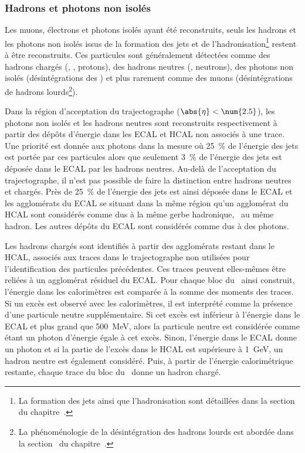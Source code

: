 \subsubsection{Hadrons et photons non isolés}
Les muons, électrons et photons isolés ayant été reconstruits, seuls les hadrons et les photons non isolés issus de la formation des jets et de l'hadronisation\footnote{La formation des jets ainsi que l'hadronisation sont détaillées dans la section~ du chapitre~.} restent à être reconstruits.
Ces particules sont généralement détectées comme des hadrons chargés (\pionpm, \Kaonpm, protons), des hadrons neutres (\Kaonlong, neutrons), des photons non isolés (désintégrations des \pionnull) et plus rarement comme des muons (désintégrations de hadrons lourds\footnote{La phénoménologie de la désintégration des hadrons lourds est abordée dans la section~ du chapitre~.}).
\par Dans la région d'acceptation du trajectographe ($\abs{\eta}<\num{2.5}$), les photons non isolés et les hadrons neutres sont reconstruits respectivement à partir des dépôts d'énergie dans les ECAL et HCAL non associés à une trace.
Une priorité est donnée aux photons dans la mesure où \SI{25}{\%} de l'énergie des jets est portée par ces particules alors que seulement \SI{3}{\%} de l'énergie des jets est déposée dans le ECAL par les hadrons neutres.
Au-delà de l'acceptation du trajectographe, il n'est pas possible de faire la distinction entre hadrons neutres et chargés.
Près de \SI{25}{\%} de l'énergie des jets est ainsi déposée dans le ECAL et les agglomérats du ECAL se situant dans la même région qu'un agglomérat du HCAL sont considérés comme dus à la même gerbe hadronique, \ie\ au même hadron.
Les autres dépôts du ECAL sont considérés comme dus à des photons.
\par Les hadrons chargés sont identifiés à partir des agglomérats restant dans le HCAL, associés aux traces dans le trajectographe non utilisées pour l'identification des particules précédentes.
Ces traces peuvent elles-mêmes être reliées à un agglomérat résiduel du ECAL.
Pour chaque bloc du \PF\ ainsi construit, l'énergie dans les calorimètres est comparée à la somme des moments des traces.
Si un excès est observé avec les calorimètres, il est interprété comme la présence d'une particule neutre supplémentaire.
Si cet excès est inférieur à l'énergie dans le ECAL et plus grand que \SI{500}{\MeV}, alors la particule neutre est considérée comme étant un photon d'énergie égale à cet excès.
Sinon, l'énergie dans le ECAL donne un photon et si la partie de l'excès dans le HCAL est supérieure à \SI{1}{\GeV}, un hadron neutre est également considéré.
Puis, à partir de l'énergie calorimétrique restante, chaque trace du bloc du \PF\ donne un hadron chargé.
